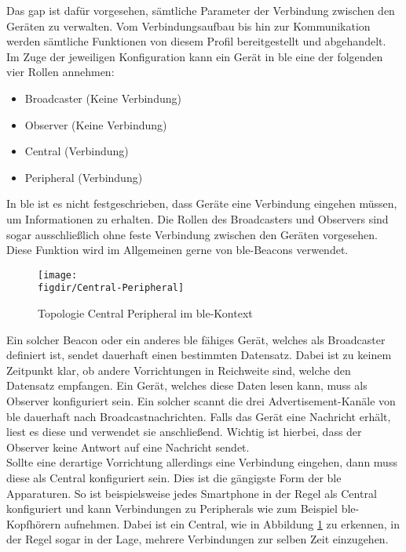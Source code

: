 \noindent Das \ac{gap} ist dafür vorgesehen, sämtliche Parameter der Verbindung zwischen den Geräten zu verwalten. Vom Verbindungsaufbau bis hin zur Kommunikation werden sämtliche Funktionen von diesem Profil bereitgestellt und abgehandelt.\\
\noindent Im Zuge der jeweiligen Konfiguration kann ein Gerät in \ac{ble} eine der folgenden vier Rollen annehmen:
\begin{itemize}
	\setlength{\itemsep}{1pt}
	\item{Broadcaster (Keine Verbindung)}
	\item{Observer (Keine Verbindung)}
	\item{Central (Verbindung)}
	\item{Peripheral (Verbindung)}
\end{itemize}   
\noindent In \ac{ble} ist es nicht festgeschrieben, dass Geräte eine Verbindung eingehen müssen, um Informationen zu erhalten. Die Rollen des Broadcasters und Observers sind sogar ausschließlich ohne feste Verbindung zwischen den Geräten vorgesehen. Diese Funktion wird im Allgemeinen gerne von \ac{ble}-Beacons verwendet.\\
\begin{figure}[b]
	\centering
	\texttt{[image: \\figdir/Central-Peripheral]}
	\caption[Topologie Central Peripheral im \ac{ble}-Kontext]{Topologie Central Peripheral im \ac{ble}-Kontext \cite[Seite 34]{Usama17:BBS}}
	\label{FIG:CenPer}
\end{figure}
\noindent Ein solcher Beacon oder ein anderes \ac{ble} fähiges Gerät, welches als Broadcaster definiert ist, sendet dauerhaft einen bestimmten Datensatz. Dabei ist zu keinem Zeitpunkt klar, ob andere Vorrichtungen in Reichweite sind, welche den Datensatz empfangen. Ein Gerät, welches diese Daten lesen kann, muss als Observer konfiguriert sein. Ein solcher scannt die drei Advertisement-Kanäle von \ac{ble} dauerhaft nach Broadcastnachrichten. Falls das Gerät eine Nachricht erhält, liest es diese und verwendet sie anschließend. Wichtig ist hierbei, dass der Observer keine Antwort auf eine Nachricht sendet.\\ 
\noindent Sollte eine derartige Vorrichtung allerdings eine Verbindung eingehen, dann muss diese als Central konfiguriert sein. Dies ist die gängigste Form der \ac{ble} Apparaturen. So ist beispielsweise jedes Smartphone in der Regel als Central konfiguriert und kann Verbindungen zu Peripherals wie zum Beispiel \ac{ble}-Kopfhörern aufnehmen. Dabei ist ein Central, wie in Abbildung \ref{FIG:CenPer} zu erkennen, in der Regel sogar in der Lage, mehrere Verbindungen zur selben Zeit einzugehen.\\
